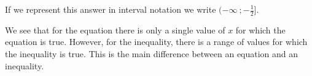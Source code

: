 If we represent this answer in interval notation we write $(-\infty ~;-\frac{1}{2}]$.\par
{}
We see that for the equation there is only a single value of $x$ for which the equation is true. However, for the inequality, there is a range of values for which the inequality is true. This is the main difference between an equation and an inequality.\par 


  
